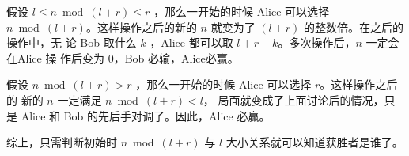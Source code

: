 \begin{frame}
假设 $l \leq n \bmod (l + r) \leq r$ ，那么一开始的时候 Alice 可以选择 $n \bmod
(l + r)$。这样操作之后的新的 $n$ 就变为了 $(l + r)$ 的整数倍。在之后的操作中，无
论 Bob 取什么 $k$ ，Alice 都可以取 $l + r - k$。多次操作后，$n$ 一定会在Alice 操
作后变为 $0$，Bob 必输，Alice必赢。

假设 $n \bmod (l + r) > r$ ，那么一开始的时候 Alice 可以选择 $r$。这样操作之后的
新的 $n$ 一定满足 $n \bmod (l + r) < l$， 局面就变成了上面讨论后的情况，只是
Alice 和 Bob 的先后手对调了。因此，Alice 必赢。

综上，只需判断初始时 $n \bmod (l + r)$ 与 $l$ 大小关系就可以知道获胜者是谁了。
\end{frame}

